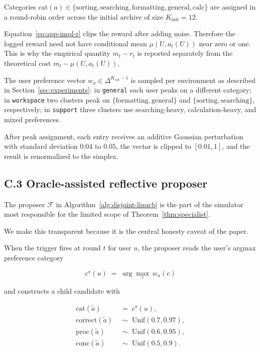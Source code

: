 \documentclass{article} %
\begin{document}
Categories $\mathrm{cat}(a) \in \{\text{sorting}, \text{searching}, \text{formatting}, \text{general}, \text{calc}\}$ are assigned in a round-robin order across the initial archive of size $K_{\text{init}} = 12$.

Equation~\eqref{eq:app-impl-r} clips the reward after adding noise. Therefore
the logged reward need not have conditional mean \(\mu(U,a_t(U))\) near zero or
one. This is why the empirical quantity \(m_t-r_t\) is reported separately
from the theoretical cost \(m_t-\mu(U,a_t(U))\).

The user preference vector \(w_u\in\Delta^{K_{\mathrm{cat}}-1}\) is sampled per
environment as described in Section~\ref{sec:experiments}: in
\texttt{general} each user peaks on a different category; in
\texttt{workspace} two clusters peak on
\(\{\text{formatting},\text{general}\}\) and
\(\{\text{sorting},\text{searching}\}\), respectively; in \texttt{support}
three clusters use searching-heavy, calculation-heavy, and mixed preferences.

After peak assignment, each entry receives an additive Gaussian perturbation with standard deviation $0.04$ to $0.05$, the vector is clipped to $[0.01, 1]$, and the result is renormalized to the simplex.

\subsection{C.3 Oracle-assisted reflective proposer}

\label{app:impl-reflection}

The proposer \(\mathcal F\) in Algorithm~\ref{alg:disjoint-linucb} is the part
of the simulator most responsible for the limited scope of
Theorem~\ref{thm:specialist}.

We make this transparent because it is the central honesty caveat of the paper.

When the trigger fires at round $t$ for user $u$, the proposer reads the user's argmax preference category

\begin{equation}
\label{eq:app-impl-peak}
c^\star(u) \;=\; \arg\max_{c}\, w_u(c)
\end{equation}

and constructs a child candidate with

\begin{align}
\label{eq:app-impl-child-cat}
\mathrm{cat}(\tilde a) &\;=\; c^\star(u),\\
\label{eq:app-impl-child-q}
\mathrm{correct}(\tilde a) &\;\sim\; \mathrm{Unif}(0.7, 0.97),\\
\label{eq:app-impl-child-p}
\mathrm{proc}(\tilde a) &\;\sim\; \mathrm{Unif}(0.6, 0.95),\\
\label{eq:app-impl-child-c}
\mathrm{conc}(\tilde a) &\;\sim\; \mathrm{Unif}(0.5, 0.9).
\end{align}
\end{document}
